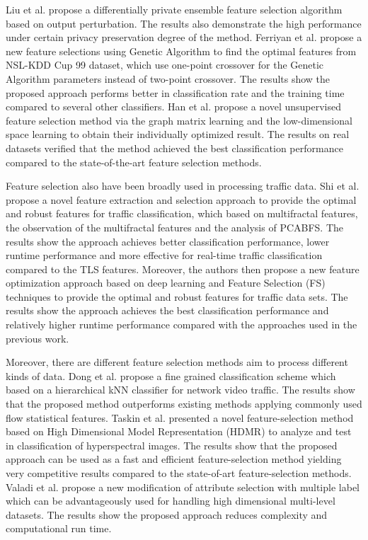 \documentclass{ieeeaccess}
\theoremstyle{definition}
\begin{document}
Liu et al. \cite{Liu2018} propose a differentially private ensemble feature selection algorithm based on output perturbation. The results also demonstrate the high performance under certain privacy preservation degree of the method. Ferriyan et al. \cite{Ferriyan2017} propose a new feature selections using Genetic Algorithm to find the optimal features from NSL-KDD Cup 99 dataset, which use one-point crossover for the Genetic Algorithm parameters instead of two-point crossover. The results show the proposed approach performs better in classification rate and the training time compared to several other classifiers. Han et al. \cite{Han2020} propose a novel unsupervised feature selection method via the graph matrix learning and the low-dimensional space learning to obtain their individually optimized result. The results on real datasets verified that the method achieved the best classification performance compared to the state-of-the-art feature selection methods.

Feature selection also have been broadly used in processing traffic data. Shi et al. \cite{Shi2017} propose a novel feature extraction and selection approach to provide the optimal and robust features for traffic classification, which based on multifractal features, the observation of the multifractal features and the analysis of PCABFS. The results show the approach achieves better classification performance, lower runtime performance and more effective for real-time traffic classification compared to the TLS features. Moreover, the authors then propose a new feature optimization approach based on deep learning and Feature Selection (FS) techniques\cite{Shi2018} to provide the optimal and robust features for traffic data sets. The results show the approach achieves the best classification performance and relatively higher runtime performance compared with the approaches used in the previous work.

Moreover, there are different feature selection methods aim to process different kinds of data. Dong et al.\cite{Dong2017} propose a fine grained classification scheme which based on a hierarchical kNN classifier for network video traffic. The results show that the proposed method outperforms existing methods applying commonly used flow statistical features. Taskin et al. \cite{Taskin2017} presented a novel feature-selection method based on High Dimensional Model Representation (HDMR) to analyze and test in classification of hyperspectral images. The results show that the proposed approach can be used as a fast and efficient feature-selection method yielding very competitive results compared to the state-of-art feature-selection methods. Valadi et al.\cite{Valadi2019} propose a new modification of attribute selection with multiple label which can be advantageously used for handling high dimensional multi-level datasets. The results show the proposed approach reduces complexity and computational run time.
\end{document}
